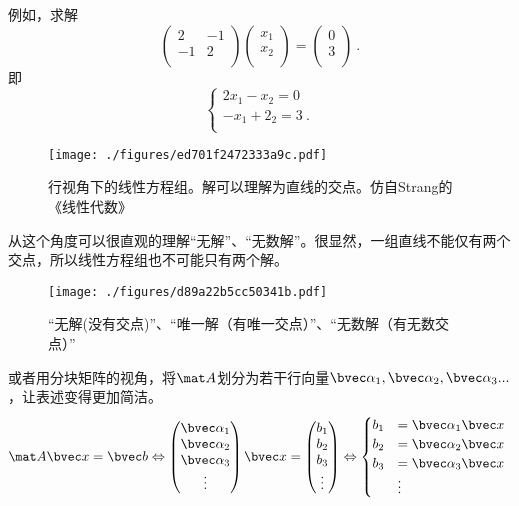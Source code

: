 \begin{example}{}
例如，求解
$$
\begin{pmatrix}
2&-1\\
-1&2\\
\end{pmatrix}
\begin{pmatrix}
x_1\\
x_2\\
\end{pmatrix}
=
\begin{pmatrix}
0\\
3\\
\end{pmatrix}~.
$$
即
$$
\begin{cases}
2x_1-x_2=0\\
-x_1+2_2=3~.\\
\end{cases}
$$
\begin{figure}[ht]
\centering
\texttt{[image: ./figures/ed701f2472333a9c.pdf]}
\caption{行视角下的线性方程组。解可以理解为直线的交点。仿自Strang的《线性代数》} \label{fig_LinEq_2}
\end{figure}
\end{example}
从这个角度可以很直观的理解“无解”、“无数解”。很显然，一组直线不能仅有两个交点，所以线性方程组也不可能只有两个解。
\begin{figure}[ht]
\centering
\texttt{[image: ./figures/d89a22b5cc50341b.pdf]}
\caption{“无解(没有交点)”、“唯一解（有唯一交点）”、“无数解（有无数交点）”} \label{fig_LinEq_3}
\end{figure}

或者用分块矩阵的视角，将$\mat A$划分为若干行向量$\bvec \alpha_1, \bvec \alpha_2,\bvec \alpha_3...$，让表述变得更加简洁。
$$
\mat A \bvec x=\bvec b \Leftrightarrow 
\begin{pmatrix}
\bvec \alpha_1\\
\bvec \alpha_2\\
\bvec \alpha_3\\
\vdots
\end{pmatrix}
\bvec x
=
\begin{pmatrix}
b_{1}\\
b_{2}\\
b_{3}\\
\vdots
\end{pmatrix}
\Leftrightarrow 
\begin{cases}
b_1&=\bvec \alpha_1 \bvec x\\
b_2&=\bvec \alpha_2 \bvec x\\
b_3&=\bvec \alpha_3 \bvec x\\
&\vdots
\end{cases}~
$$

